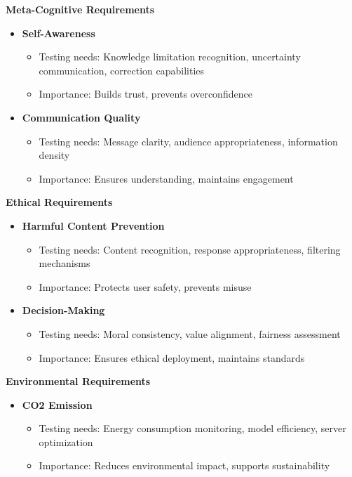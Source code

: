 \textbf{Meta-Cognitive Requirements}
\begin{itemize}
    \item \textbf{Self-Awareness}
    \begin{itemize}
        \item Testing needs: Knowledge limitation recognition, uncertainty communication, correction capabilities
        \item Importance: Builds trust, prevents overconfidence
    \end{itemize}
    
    \item \textbf{Communication Quality}
    \begin{itemize}
        \item Testing needs: Message clarity, audience appropriateness, information density
        \item Importance: Ensures understanding, maintains engagement
    \end{itemize}
\end{itemize}

\textbf{Ethical Requirements}
\begin{itemize}
    \item \textbf{Harmful Content Prevention}
    \begin{itemize}
        \item Testing needs: Content recognition, response appropriateness, filtering mechanisms
        \item Importance: Protects user safety, prevents misuse
    \end{itemize}
    
    \item \textbf{Decision-Making}
    \begin{itemize}
        \item Testing needs: Moral consistency, value alignment, fairness assessment
        \item Importance: Ensures ethical deployment, maintains standards
    \end{itemize}
\end{itemize}

\textbf{Environmental Requirements}
\begin{itemize}
    \item \textbf{CO2 Emission}
    \begin{itemize}
        \item Testing needs: Energy consumption monitoring, model efficiency, server optimization
        \item Importance: Reduces environmental impact, supports sustainability
    \end{itemize}
\end{itemize}




